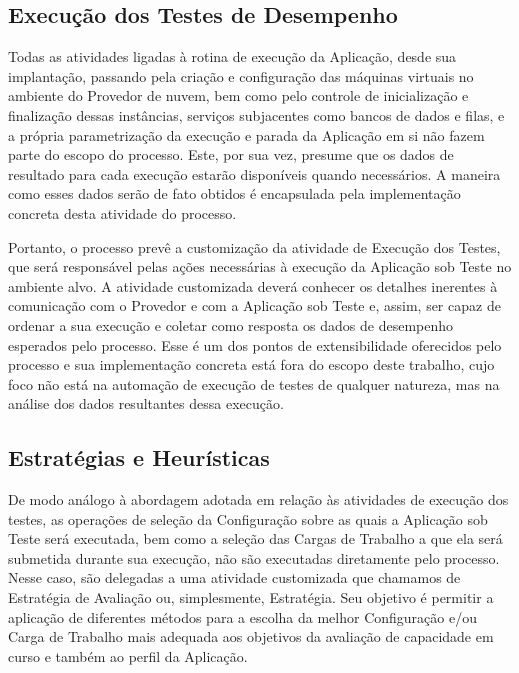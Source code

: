 \subsection{Execução dos Testes de Desempenho}
Todas as atividades ligadas à rotina de execução da Aplicação, desde sua implantação,
passando pela criação e configuração das máquinas virtuais no ambiente do Provedor 
de nuvem, bem como pelo controle de inicialização e finalização dessas instâncias, 
serviços subjacentes como bancos de dados e filas, e a própria parametrização da 
execução e parada da Aplicação em si não fazem parte do escopo do processo. Este,
por sua vez, presume que os dados de resultado para cada execução estarão disponíveis
quando necessários. A maneira como esses dados serão de fato obtidos é
encapsulada pela implementação concreta desta atividade do processo.


Portanto, o processo prevê a customização da atividade de Execução dos Testes,
que será responsável pelas ações necessárias à execução da Aplicação sob Teste no ambiente
alvo. A atividade customizada deverá conhecer os detalhes inerentes à comunicação com 
o Provedor e com a Aplicação sob Teste e, assim, ser capaz de ordenar a sua execução e 
coletar como resposta os dados de desempenho esperados pelo processo. Esse é um dos 
pontos de extensibilidade oferecidos pelo processo e sua implementação concreta está 
fora do escopo deste trabalho, cujo foco não está na automação de execução de testes 
de qualquer natureza, mas na análise dos dados resultantes dessa execução.

\subsection{Estratégias e Heurísticas}
\label{sec:heuristicas}
De modo análogo à abordagem adotada em relação às atividades de execução dos
testes, as operações de seleção da Configuração sobre as quais a Aplicação
sob Teste será executada, bem como a seleção das Cargas de Trabalho a que ela 
será submetida durante sua execução, não são executadas diretamente pelo processo.
Nesse caso, são delegadas a uma atividade customizada que chamamos de Estratégia de 
Avaliação ou, simplesmente, Estratégia. Seu objetivo é permitir a aplicação de 
diferentes métodos para a escolha da melhor Configuração e/ou Carga de Trabalho 
mais adequada aos objetivos da avaliação de capacidade em curso e também ao perfil 
da Aplicação.

